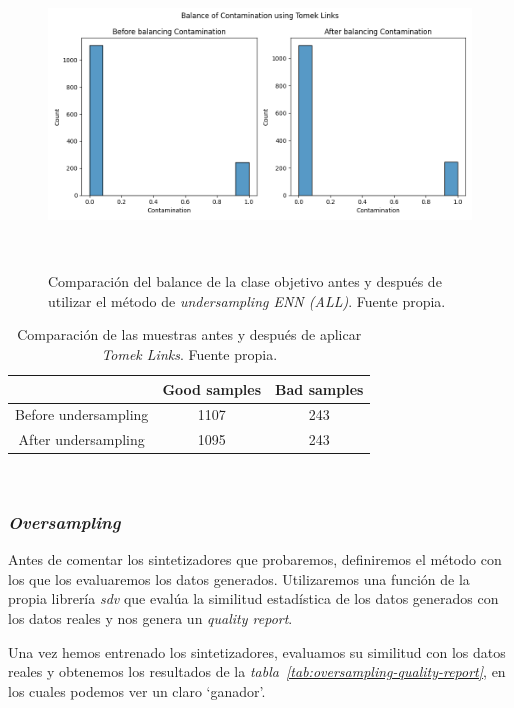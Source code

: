 \begin{figure}[!ht]
    \centering
    \includegraphics[width=0.8\linewidth]{media/images/balance.png}
    \caption{Comparación del balance de la clase objetivo antes y después de utilizar el método de \textit{undersampling ENN (ALL)}. Fuente propia.}\ \label{fig:balance-tl}
\end{figure}

\begin{table}
    \centering
    \begin{tabular}{|c|cc|} \hline
        & Good samples & Bad samples \\ \hline
        Before undersampling & 1107 & 243 \\
        After undersampling & 1095 & 243 \\ \hline
    \end{tabular}
    \caption{Comparación de las muestras antes y después de aplicar \textit{Tomek Links}. Fuente propia.}\ \label{tab:balance-tl-comparison}
\end{table}


\clearpage

\subsubsection{\textit{Oversampling}}

Antes de comentar los sintetizadores que probaremos, definiremos el método con los que los evaluaremos los datos generados. Utilizaremos una función de la propia librería \textit{sdv} que evalúa la similitud estadística de los datos generados con los datos reales y nos genera un \textit{quality report}.

Una vez hemos entrenado los sintetizadores, evaluamos su similitud con los datos reales y obtenemos los resultados de la \textit{tabla\ \ref{tab:oversampling-quality-report}}, en los cuales podemos ver un claro `ganador'.

